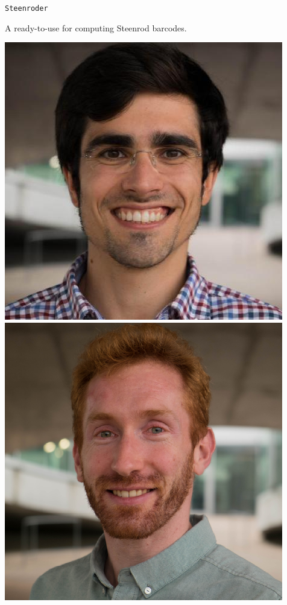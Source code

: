 \begin{frame}{\texttt{Steenroder}}
	\pause

	A ready-to-use  for computing Steenrod barcodes.

	\begin{center}
		\includegraphics[scale=.1]{aux/umberto}
		\qquad
		\includegraphics[scale=.1]{aux/guillaume}
	\end{center}


\end{frame}
